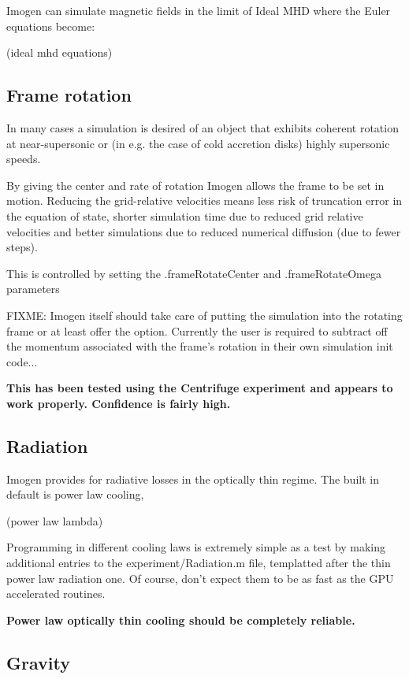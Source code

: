 \documentclass[letterpaper,12pt,twocolumn]{article}
\begin{document}
Imogen can simulate magnetic fields in the limit of Ideal MHD where the Euler equations
become:

(ideal mhd equations)

\subsection{Frame rotation}

In many cases a simulation is desired of an object that exhibits coherent rotation at
near-supersonic or (in e.g. the case of cold accretion disks) highly supersonic speeds.

By giving the center and rate of rotation Imogen allows the frame to be set in motion.
Reducing the grid-relative velocities means less risk of truncation error in the equation
of state, shorter simulation time due to reduced grid relative velocities and better
simulations due to reduced numerical diffusion (due to fewer steps).

This is controlled by setting the .frameRotateCenter and .frameRotateOmega parameters

FIXME: Imogen itself should take care of putting the simulation into the rotating frame
or at least offer the option. Currently the user is required to subtract off the momentum
associated with the frame's rotation in their own simulation init code...

\textbf{This has been tested using the Centrifuge experiment and appears to work properly.
Confidence is fairly high.}

\subsection{Radiation}

Imogen provides for radiative losses in the optically thin regime. The built in default
is power law cooling,

(power law lambda)

Programming in different cooling laws is extremely simple as a test by making additional
entries to the experiment/Radiation.m file, templatted after the thin power law radiation
one. Of course, don't expect them to be as fast as the GPU accelerated routines.

\textbf{Power law optically thin cooling should be completely reliable.} 

\subsection{Gravity}
\end{document}
